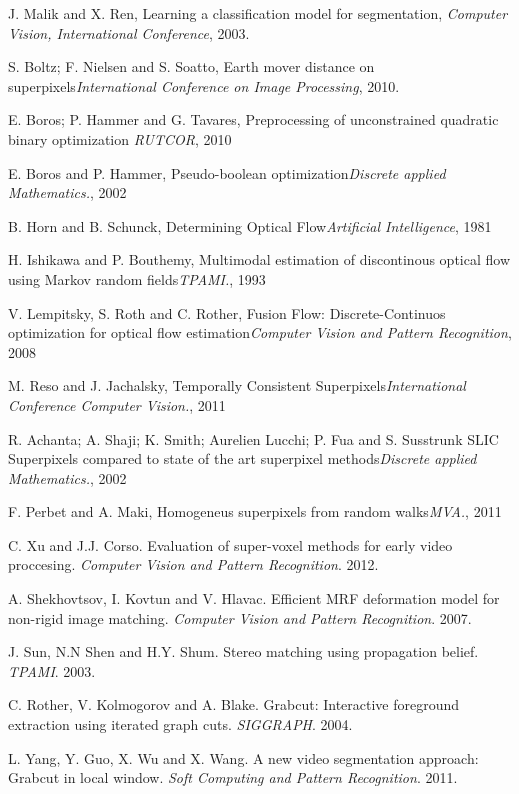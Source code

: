 \documentclass[a4paper, 10pt, conference]{ieeeconf}      %
\begin{document}
\begin{thebibliography}{99}

J. Malik and X. Ren, Learning a classification model for segmentation, {\it Computer Vision, International Conference}, 2003.

S. Boltz; F. Nielsen and S. Soatto, Earth mover distance on superpixels{\it International Conference on Image Processing}, 2010.

E. Boros; P. Hammer and G. Tavares, Preprocessing of unconstrained quadratic binary optimization {\it RUTCOR}, 2010

E. Boros and P. Hammer, Pseudo-boolean optimization{\it Discrete applied Mathematics.}, 2002

B. Horn and B. Schunck, Determining Optical Flow{\it Artificial Intelligence}, 1981

H. Ishikawa and P. Bouthemy, Multimodal estimation of discontinous optical flow using Markov random fields{\it TPAMI.}, 1993

V. Lempitsky, S. Roth and C. Rother, Fusion Flow: Discrete-Continuos optimization for optical flow estimation{\it Computer Vision and Pattern Recognition}, 2008

M. Reso and J. Jachalsky, Temporally Consistent Superpixels{\it International Conference Computer Vision.}, 2011

R. Achanta; A. Shaji; K. Smith; Aurelien Lucchi; P. Fua and S. Susstrunk SLIC Superpixels compared to state of the art superpixel methods{\it Discrete applied Mathematics.}, 2002

F. Perbet and A. Maki, Homogeneus superpixels from random walks{\it MVA.}, 2011

C. Xu and J.J. Corso. Evaluation of super-voxel methods for early video proccesing. {\it Computer Vision and Pattern Recognition}. 2012.

A. Shekhovtsov, I. Kovtun and V. Hlavac. Efficient MRF deformation model for non-rigid image matching. {\it Computer Vision and Pattern Recognition}. 2007.

J. Sun, N.N Shen and H.Y. Shum. Stereo matching using propagation belief. {\it TPAMI}. 2003.

C. Rother, V. Kolmogorov and A. Blake. Grabcut: Interactive foreground extraction using iterated graph cuts. {\it SIGGRAPH}. 2004.

L. Yang, Y. Guo, X. Wu and X. Wang. A new video segmentation approach: Grabcut in local window. {\it Soft Computing and Pattern Recognition}. 2011.

\end{thebibliography}
\end{document}
